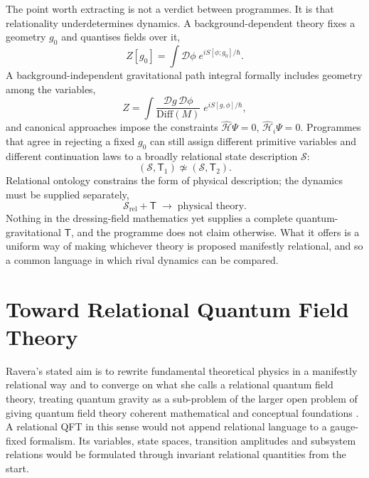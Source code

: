 \documentclass[11pt]{article}
\theoremstyle{plain}
\theoremstyle{definition}
\theoremstyle{remark}
\newcommand{\Diff}{\mathrm{Diff}}
\begin{document}
The point worth extracting is not a verdict between programmes. It is that relationality underdetermines dynamics. A background-dependent theory fixes a geometry $g_0$ and quantises fields over it,
\begin{equation}
Z[g_0]=\int\mathcal D\phi\;e^{iS[\phi;g_0]/\hbar}.
\end{equation}
A background-independent gravitational path integral formally includes geometry among the variables,
\begin{equation}
Z=\int\frac{\mathcal Dg\,\mathcal D\phi}{\Diff(M)}\;e^{iS[g,\phi]/\hbar},
\end{equation}
and canonical approaches impose the constraints $\widehat{\mathcal H}\Psi=0$, $\widehat{\mathcal H}_i\Psi=0$. Programmes that agree in rejecting a fixed $g_0$ can still assign different primitive variables and different continuation laws to a broadly relational state description $\mathcal S$:
\begin{equation}
(\mathcal S,\mathsf T_1)\not\simeq(\mathcal S,\mathsf T_2).
\end{equation}
Relational ontology constrains the form of physical description; the dynamics must be supplied separately,
\begin{equation}
\mathcal S_{\mathrm{rel}}+\mathsf T\;\longrightarrow\;\text{physical theory}.
\end{equation}
Nothing in the dressing-field mathematics yet supplies a complete quantum-gravitational $\mathsf T$, and the programme does not claim otherwise. What it offers is a uniform way of making whichever theory is proposed manifestly relational, and so a common language in which rival dynamics can be compared.

\section{Toward Relational Quantum Field Theory}\label{sec:rqft}

Ravera's stated aim is to rewrite fundamental theoretical physics in a manifestly relational way and to converge on what she calls a relational quantum field theory, treating quantum gravity as a sub-problem of the larger open problem of giving quantum field theory coherent mathematical and conceptual foundations \cite{toe}. A relational QFT in this sense would not append relational language to a gauge-fixed formalism. Its variables, state spaces, transition amplitudes and subsystem relations would be formulated through invariant relational quantities from the start.
\end{document}
